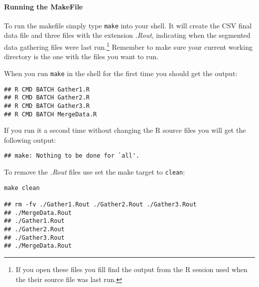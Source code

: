 \paragraph{Running the MakeFile}

To run the makefile simply type \texttt{make} into your shell. It will create the CSV final data file and three files with the extension \emph{.Rout}, indicating when the segmented data gathering files were last run.\footnote{If you open these files you fill find the output from the R session used when the their source file was last run.} Remember to make sure your current working directory is the one with the files you want to run. 

When you run \verb|make| in the shell for the first time you should get the output:

\begin{knitrout}
	\color{fgcolor}
	\begin{kframe}
		\begin{verbatim}
## R CMD BATCH Gather1.R
## R CMD BATCH Gather2.R
## R CMD BATCH Gather3.R
## R CMD BATCH MergeData.R
			\end{verbatim}
		\end{kframe}
\end{knitrout}

\noindent If you run it a second time without changing the R source files you will get the following output:

\begin{knitrout}
	\color{fgcolor}
	\begin{kframe}
		\begin{verbatim}
## make: Nothing to be done for `all'.
			\end{verbatim}
		\end{kframe}
\end{knitrout}

To remove the \emph{.Rout} files use set the make target to \texttt{clean}:

\begin{knitrout}
	\color{fgcolor}
	\begin{kframe}
		\begin{verbatim}
make clean

## rm -fv ./Gather1.Rout ./Gather2.Rout ./Gather3.Rout 
## ./MergeData.Rout
## ./Gather1.Rout
## ./Gather2.Rout
## ./Gather3.Rout
## ./MergeData.Rout
			\end{verbatim}
		\end{kframe}
\end{knitrout}


